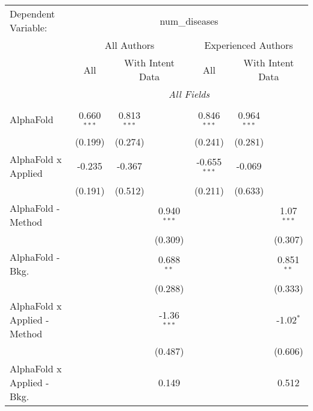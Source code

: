 \begingroup
\centering
\begin{tabular}{lcccccc}
   \tabularnewline \midrule \midrule
   Dependent Variable: & \multicolumn{6}{c}{num\_diseases}\\
 & \multicolumn{3}{c}{All Authors} & \multicolumn{3}{c}{Experienced Authors} \\
\cmidrule(lr){2-4} \cmidrule(lr){5-7}
 & \multicolumn{1}{c}{All} & \multicolumn{2}{c}{With Intent Data} & \multicolumn{1}{c}{All} & \multicolumn{2}{c}{With Intent Data} \\
\cmidrule(lr){2-2} \cmidrule(lr){3-4} \cmidrule(lr){5-5} \cmidrule(lr){6-7}
 & \multicolumn{6}{c}{\textit{All Fields}} \\ \\
   AlphaFold                      & 0.660$^{***}$ & 0.813$^{***}$ &               & 0.846$^{***}$  & 0.964$^{***}$ &   \\   
                                  & (0.199)       & (0.274)       &               & (0.241)        & (0.281)       &   \\   
   AlphaFold x Applied            & -0.235        & -0.367        &               & -0.655$^{***}$ & -0.069        &   \\   
                                  & (0.191)       & (0.512)       &               & (0.211)        & (0.633)       &   \\   
   AlphaFold - Method             &               &               & 0.940$^{***}$ &                &               & 1.07$^{***}$\\   
                                  &               &               & (0.309)       &                &               & (0.307)\\   
   AlphaFold - Bkg.               &               &               & 0.688$^{**}$  &                &               & 0.851$^{**}$\\   
                                  &               &               & (0.288)       &                &               & (0.333)\\   
   AlphaFold x Applied - Method   &               &               & -1.36$^{***}$ &                &               & -1.02$^{*}$\\   
                                  &               &               & (0.487)       &                &               & (0.606)\\   
   AlphaFold x Applied - Bkg.     &               &               & 0.149         &                &               & 0.512\\   

\end{tabular}
